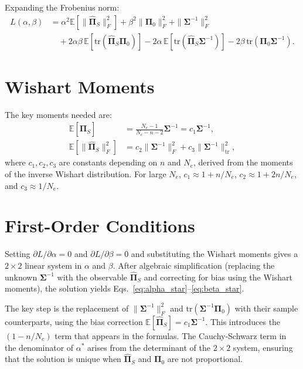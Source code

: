 Expanding the Frobenius norm:
\begin{align}
L(\alpha, \beta) &= \alpha^2 \mathbb{E}[\|\hat{\boldsymbol{\Pi}}_S\|_F^2] + \beta^2 \|\boldsymbol{\Pi}_0\|_F^2 + \|\boldsymbol{\Sigma}^{-1}\|_F^2 \nonumber \\
&\quad + 2\alpha\beta \, \mathbb{E}[\text{tr}(\hat{\boldsymbol{\Pi}}_S \boldsymbol{\Pi}_0)] - 2\alpha \, \mathbb{E}[\text{tr}(\hat{\boldsymbol{\Pi}}_S \boldsymbol{\Sigma}^{-1})] - 2\beta \, \text{tr}(\boldsymbol{\Pi}_0 \boldsymbol{\Sigma}^{-1}). \label{eq:app_expanded}
\end{align}

\section{Wishart Moments}

The key moments needed are:
\begin{align}
\mathbb{E}[\hat{\boldsymbol{\Pi}}_S] &= \frac{N_e - 1}{N_e - n - 2} \boldsymbol{\Sigma}^{-1} = c_1 \boldsymbol{\Sigma}^{-1}, \label{eq:app_moment1} \\
\mathbb{E}[\|\hat{\boldsymbol{\Pi}}_S\|_F^2] &= c_2 \|\boldsymbol{\Sigma}^{-1}\|_F^2 + c_3 \|\boldsymbol{\Sigma}^{-1}\|_{\text{tr}}^2, \label{eq:app_moment2}
\end{align}
where $c_1, c_2, c_3$ are constants depending on $n$ and $N_e$, derived from the moments of the inverse Wishart distribution. For large $N_e$, $c_1 \approx 1 + n/N_e$, $c_2 \approx 1 + 2n/N_e$, and $c_3 \approx 1/N_e$.

\section{First-Order Conditions}

Setting $\partial L / \partial \alpha = 0$ and $\partial L / \partial \beta = 0$ and substituting the Wishart moments gives a $2 \times 2$ linear system in $\alpha$ and $\beta$. After algebraic simplification (replacing the unknown $\boldsymbol{\Sigma}^{-1}$ with the observable $\hat{\boldsymbol{\Pi}}_S$ and correcting for bias using the Wishart moments), the solution yields Eqs.~\eqref{eq:alpha_star}--\eqref{eq:beta_star}.

The key step is the replacement of $\|\boldsymbol{\Sigma}^{-1}\|_F^2$ and $\text{tr}(\boldsymbol{\Sigma}^{-1} \boldsymbol{\Pi}_0)$ with their sample counterparts, using the bias correction $\mathbb{E}[\hat{\boldsymbol{\Pi}}_S] = c_1 \boldsymbol{\Sigma}^{-1}$. This introduces the $(1 - n/N_e)$ term that appears in the formulas. The Cauchy-Schwarz term in the denominator of $\alpha^*$ arises from the determinant of the $2 \times 2$ system, ensuring that the solution is unique when $\hat{\boldsymbol{\Pi}}_S$ and $\boldsymbol{\Pi}_0$ are not proportional.

